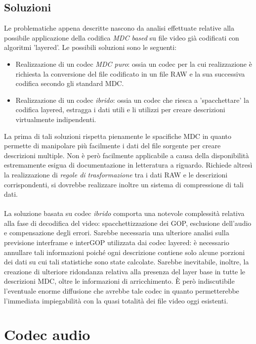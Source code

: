 \subsection{Soluzioni}

Le problematiche appena descritte nascono da analisi effettuate relative alla
possibile applicazione della codifica \emph{MDC based} su file video già
codificati con algoritmi 'layered'. Le possibili soluzioni sono le seguenti:

\begin{itemize}
  \item Realizzazione di un codec \emph{MDC puro}: ossia un codec per la cui
  realizzazione è richiesta la conversione del file codificato in un file RAW e
  la sua successiva codifica secondo gli standard MDC.
  \item Realizzazione di un codec \emph{ibrido}: ossia un codec che riesca a
  'spacchettare' la codifica layered, estragga i dati utili e li utilizzi per
  creare descrizioni virtualmente indipendenti.
\end{itemize}

La prima di tali soluzioni rispetta pienamente le spacifiche MDC in quanto
permette di manipolare più facilmente i dati del file sorgente per creare
descrizioni multiple. Non è però facilmente applicabile a causa della
disponibilità estremamente esigua di documentazione in letteratura a riguardo. Richiede
altresì la realizzazione di \emph{regole di trasformazione} tra i dati RAW e le
descrizioni corrispondenti, si dovrebbe realizzare inoltre un sistema di
compressione di tali dati.
\\\\
La soluzione basata su codec \emph{ibrido} comporta una notevole complessità
relativa alla fase di decodifica del video: spacchettizzazione dei GOP,
esclusione dell'audio e compensazione degli errori. Sarebbe necessaria una
ulteriore analisi sulla previsione interframe e interGOP utilizzata dai codec
layered: è necessario annullare tali informazioni poiché ogni descrizione
contiene solo alcune porzioni dei dati su cui tali statistiche sono state calcolate.
Sarebbe inevitabile, inoltre, la creazione di ulteriore ridondanza relativa
alla presenza del layer base in tutte le descrizioni MDC, oltre le informazioni
di arricchimento. \`E però indiscutibile l'eventuale enorme diffusione che avrebbe
tale codec in quanto permetterebbe l'immediata impiegabilità con la quasi totalità dei file video oggi esistenti.

\section{Codec audio}

